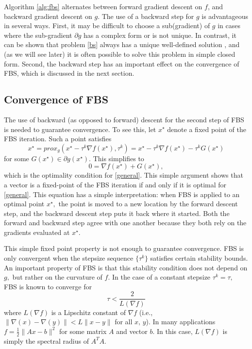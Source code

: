 \documentclass{amsart}
\newcommand{\half}{\frac{1}{2}}
\newcommand{\eqn}[2]{\begin{equation}\label{#1}#2\end{equation}}
\newcommand{\opt}{^\star}
\theoremstyle{definition}
\begin{document}
    Algorithm \ref{alg:fbs} alternates between forward gradient descent on $f$, and backward gradient descent on $g$.
    The use of a backward step for $g$ is advantageous in several ways. First, it may be difficult to choose a sub(gradient) of $g$ in cases where the sub-gradient $\partial g$ has a complex form or is not unique.  In contrast, it can be shown that problem \eqref{bs} always has a unique well-defined solution \cite{CW05}, and (as we will see later) it is often possible to solve this problem in simple closed form. Second, the backward step has an important effect on the convergence of FBS, which is discussed in the next section.
    
    \subsection{Convergence of FBS}
    The use of backward (as opposed to forward) descent for the second step of FBS is needed to guarantee convergence.  To see this,  let $x\opt$  denote a fixed point of the FBS iteration.  Such a point satisfies
       $$x\opt = prox_g\left(x\opt - \tau^k \nabla f(x\opt),\tau^k\right)= x\opt - \tau^k \nabla f(x\opt) - \tau^k G(x\opt)$$
    for some $G(x\opt) \in \partial g(x\opt).$  This simplifies to 
    $$0  =\nabla f(x\opt)+G(x\opt),$$
    which is the optimality condition for \eqref{general}.  This simple argument shows that a vector is a fixed-point of the FBS iteration if and only if it is optimal for \eqref{general}.  This equation has a simple interpretation:  when FBS is applied to an optimal point $x\opt,$ the point is moved to a new location by the forward descent step, and the backward descent step puts it back where it started.  Both the forward and backward step agree with one another because they both rely on the gradients evaluated at $x\opt.$ 
    
    This simple fixed point property is not enough to guarantee convergence.  FBS is only convergent when the stepsize sequence $\{\tau^k\}$ satisfies certain stability bounds.  An important property of FBS is that this stability condition does not depend on $g,$ but rather on the curvature of $f.$      
     In the case of a constant stepsize $\tau^k=\tau,$ FBS is known to converge for 
    \eqn{restrict}{\tau < \frac{2}{L(\nabla f)}}
    where $L(\nabla f)$ is a Lipschitz constant of $\nabla f$  (i.e., $\|\nabla(x)-\nabla(y)\|<L\|x-y\|$ for all $x,\,y$).   In many applications $f=\half \|Ax-b\|^2$ for some matrix $A$ and vector $b.$  In this case, $L(\nabla f)$ is simply the spectral radius of $A^TA.$
    
\end{document}
